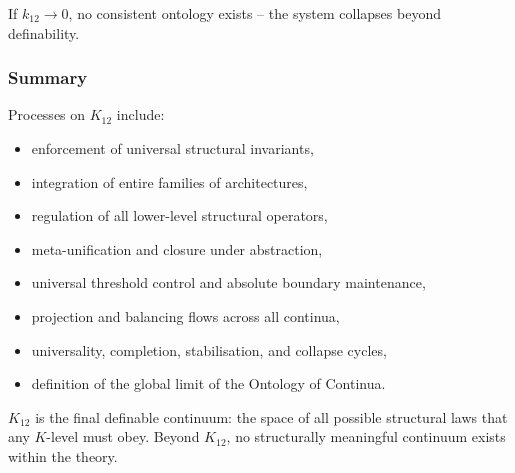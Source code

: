 If $k_{12} \to 0$,
no consistent ontology exists -- the system collapses beyond definability.

\subsubsection{Summary}

Processes on $K_{12}$ include:
\begin{itemize}
    \item enforcement of universal structural invariants,
    \item integration of entire families of architectures,
    \item regulation of all lower-level structural operators,
    \item meta-unification and closure under abstraction,
    \item universal threshold control and absolute boundary maintenance,
    \item projection and balancing flows across all continua,
    \item universality, completion, stabilisation, and collapse cycles,
    \item definition of the global limit of the Ontology of Continua.
\end{itemize}

$K_{12}$ is the final definable continuum:
the space of all possible structural laws that any $K$-level must obey.
Beyond $K_{12}$, no structurally meaningful continuum exists within the theory.
